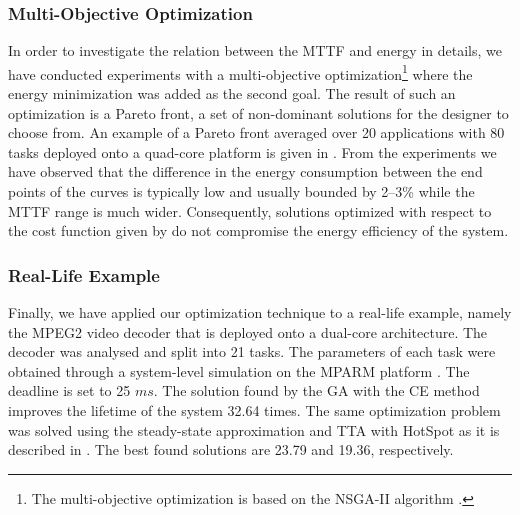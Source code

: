 \subsubsection{Multi-Objective Optimization}
In order to investigate the relation between the MTTF and energy in details, we have conducted experiments with a multi-objective optimization\footnote{The multi-objective optimization is based on the NSGA-II algorithm \cite{deb2002}.} where the energy minimization was added as the second goal. The result of such an optimization is a Pareto front, a set of non-dominant solutions for the designer to choose from. An example of a Pareto front averaged over 20 applications with 80 tasks deployed onto a quad-core platform is given in . From the experiments we have observed that the difference in the energy consumption between the end points of the curves is typically low and usually bounded by 2--3\% while the MTTF range is much wider. Consequently, solutions optimized with respect to the cost function given by  do not compromise the energy efficiency of the system.

\subsubsection{Real-Life Example}
Finally, we have applied our optimization technique to a real-life example, namely the MPEG2 video decoder \cite{ffmpeg2011} that is deployed onto a dual-core architecture. The decoder was analysed and split into 21 tasks. The parameters of each task were obtained through a system-level simulation on the MPARM platform \cite{benini2005}. The deadline is set to 25 $ms$. The solution found by the GA with the CE method improves the lifetime of the system 32.64 times. The same optimization problem was solved using the steady-state approximation and TTA with HotSpot as it is described in . The best found solutions are 23.79 and 19.36, respectively.

